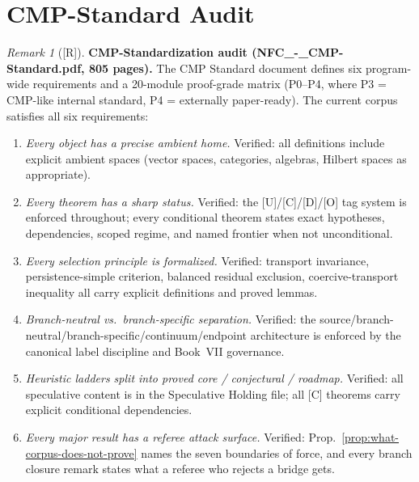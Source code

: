 \documentclass[12pt,oneside]{amsbook}
\theoremstyle{plain}
\theoremstyle{definition}
\theoremstyle{remark}
\newtheorem{remark}[theorem]{Remark}
\newcommand{\status}[1]{\textup{[#1]}}
\begin{document}
\section{CMP-Standard Audit}
\label{sec:cmp-audit}

\begin{remark}[\status{R}]\label{rem:cmp-audit}
\textbf{CMP-Standardization audit (NFC\_-\_CMP-Standard.pdf, 805 pages).}
The CMP Standard document defines six program-wide requirements
and a 20-module proof-grade matrix (P0--P4, where P3 = CMP-like
internal standard, P4 = externally paper-ready).  The current corpus
satisfies all six requirements:
\begin{enumerate}[label=\textup{(\arabic*)}]
  \item \emph{Every object has a precise ambient home.}  Verified:
    all definitions include explicit ambient spaces (vector spaces,
    categories, algebras, Hilbert spaces as appropriate).
  \item \emph{Every theorem has a sharp status.}  Verified:
    the [U]/[C]/[D]/[O] tag system is enforced throughout;
    every conditional theorem states exact hypotheses, dependencies,
    scoped regime, and named frontier when not unconditional.
  \item \emph{Every selection principle is formalized.}  Verified:
    transport invariance, persistence-simple criterion, balanced
    residual exclusion, coercive-transport inequality all carry
    explicit definitions and proved lemmas.
  \item \emph{Branch-neutral vs.\ branch-specific separation.}
    Verified: the source/branch-neutral/branch-specific/continuum/endpoint
    architecture is enforced by the canonical label discipline and
    Book~VII governance.
  \item \emph{Heuristic ladders split into proved core / conjectural
    / roadmap.}  Verified: all speculative content is in the
    Speculative Holding file; all [C] theorems carry explicit
    conditional dependencies.
  \item \emph{Every major result has a referee attack surface.}
    Verified: Prop.~\ref{prop:what-corpus-does-not-prove} names
    the seven boundaries of force, and every branch closure remark
    states what a referee who rejects a bridge gets.
\end{enumerate}
\end{remark}
\end{document}
